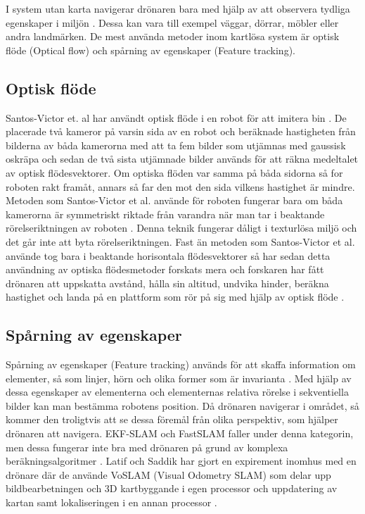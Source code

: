 I system utan karta navigerar drönaren bara med hjälp av att observera tydliga egenskaper i miljön \citep{982903}. Dessa kan vara till exempel väggar, dörrar, möbler eller andra landmärken. De mest använda metoder inom kartlösa system är optisk flöde (Optical flow) och spårning av egenskaper (Feature tracking). 

\subsection{Optisk flöde}

Santos-Victor et. al har användt optisk flöde i en robot för att imitera bin \citep{341094}. De placerade två kameror på varsin sida av en robot och beräknade hastigheten från bilderna av båda kamerorna med att ta fem bilder som utjämnas med gaussisk oskräpa och sedan de två sista utjämnade bilder används för att räkna medeltalet av optisk flödesvektorer. Om optiska flöden var samma på båda sidorna så for roboten rakt framåt, annars så far den mot den sida vilkens hastighet är mindre. Metoden som Santos-Victor et al. använde för roboten fungerar bara om båda kamerorna är symmetriskt riktade från varandra när man tar i beaktande rörelseriktningen av roboten \citep{982903}. Denna teknik fungerar dåligt i texturlösa miljö och det går inte att byta rörelseriktningen. Fast än metoden som Santos-Victor et al. använde tog bara i beaktande horisontala flödesvektorer så har sedan detta användning av optiska flödesmetoder forskats mera och forskaren har fått drönaren att uppskatta avstånd, hålla sin altitud, undvika hinder, beräkna hastighet och landa på en plattform som rör på sig med hjälp av optisk flöde \citep{6564752}.

\subsection{Spårning av egenskaper}

Spårning av egenskaper (Feature tracking) används för att skaffa information om elementer, så som linjer, hörn och olika former som är invarianta \citep{geospatial}. Med hjälp av dessa egenskaper av elementerna och elementernas relativa rörelse i sekventiella bilder kan man bestämma robotens position. Då drönaren navigerar i området, så kommer den troligtvis att se dessa föremål från olika perspektiv, som hjälper drönaren att navigera. EKF-SLAM och FastSLAM faller under denna kategorin, men dessa fungerar inte bra med drönaren på grund av komplexa beräkningsalgoritmer \cite{8930783}. Latif och Saddik har gjort en expirement inomhus med en drönare där de använde VoSLAM (Visual Odometry SLAM) som delar upp bildbearbetningen och 3D kartbyggande i egen processor och uppdatering av kartan samt lokaliseringen i en annan processor \citep{8930783}.

